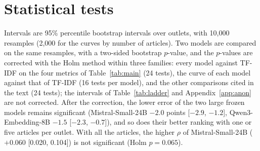 \documentclass[11pt,a4paper]{article}
\begin{document}
\begin{table}[h]
\centering
\caption{More metrics per outlet. Each row is a model, as in Table~\ref{tab:main}; brackets give 95\% bootstrap
intervals. Higher $R^2$ and AUC and lower RMSE are better.}\label{tab:more}
\end{table}

\section{Statistical tests}\label{app:stats}
Intervals are 95\% percentile bootstrap intervals over outlets, with 10,000 resamples (2,000 for the curves by number of
articles). Two models are compared on the same resamples, with a two-sided bootstrap $p$-value, and the $p$-values are
corrected with the Holm method within three families: every model against TF-IDF on the four metrics of
Table~\ref{tab:main} (24 tests), the curve of each model against that of TF-IDF (16 tests per model), and the other
comparisons cited in the text (24 tests); the intervals of Table~\ref{tab:ladder} and Appendix~\ref{app:anon} are not
corrected. After the correction, the lower error of the two large frozen models remains significant
(Mistral-Small-24B $-2.0$ points [$-2.9$, $-1.2$], Qwen3-Embedding-8B $-1.5$ [$-2.3$, $-0.7$]), and so does their better
ranking with one or five articles per outlet. With all the articles, the higher $\rho$ of Mistral-Small-24B ($+0.060$
[0.020, 0.104]) is not significant (Holm $p = 0.065$).
\end{document}
